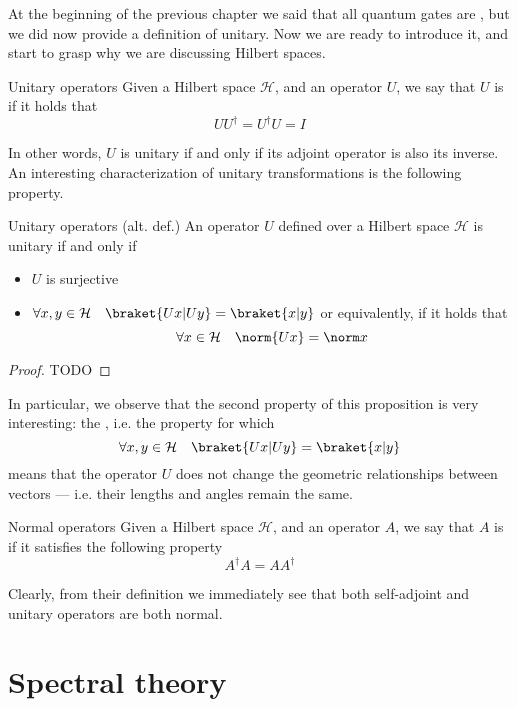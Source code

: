 \documentclass[a4paper, 12pt]{report}
\begin{document}
At the beginning of the previous chapter we said that all quantum gates are , but we did now provide a definition of unitary. Now we are ready to introduce it, and start to grasp why we are discussing Hilbert spaces.

\begin{frameddefn}{Unitary operators}
	Given a Hilbert space $\mathcal H$, and an operator $U$, we say that $U$ is  if it holds that $$UU^\dag = U^\dag U = I$$
\end{frameddefn}

In other words, $U$ is unitary if and only if its adjoint operator is also its inverse. An interesting characterization of unitary transformations is the following property.

\begin{framedprop}{Unitary operators (alt. def.)}
	An operator $U$ defined over a Hilbert space $\mathcal H$ is unitary if and only if

	\begin{itemize}
		\item $U$ is surjective
		\item $\forall x, y \in \mathcal H \quad \braket{Ux|Uy} = \braket{x|y}$ or equivalently, if it holds that $$\forall x \in \mathcal H \quad \norm{Ux} = \norm x$$
	\end{itemize}
\end{framedprop}

\begin{proof}
    TODO 
\end{proof}

In particular, we observe that the second property of this proposition is very interesting: the , i.e. the property for which $$\forall x, y \in \mathcal H \quad \braket{Ux|Uy} = \braket{x|y}$$ means that the operator $U$ does not change the geometric relationships between vectors --- i.e. their lengths and angles remain the same.

\begin{frameddefn}{Normal operators}
	Given a Hilbert space $\mathcal H$, and an operator $A$, we say that $A$ is  if it satisfies the following property $$A^\dag A = AA^\dag$$
\end{frameddefn}

Clearly, from their definition we immediately see that both self-adjoint and unitary operators are both normal.

\section{Spectral theory}
\end{document}
